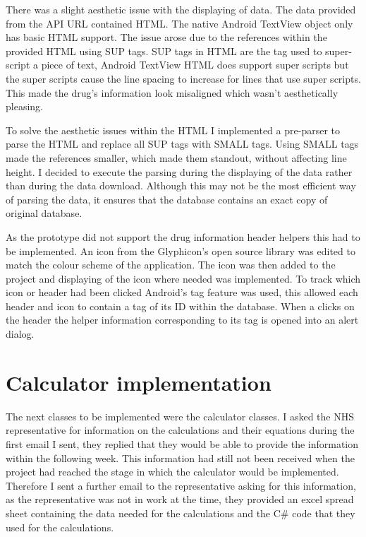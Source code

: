 There was a slight aesthetic issue with the displaying of data. The data provided from the API URL contained HTML. The native Android TextView object only has basic HTML support. The issue arose due to the references within the provided HTML using SUP tags. SUP tags in HTML are the tag used to super-script a piece of text, Android TextView HTML does support super scripts but the super scripts cause the line spacing to increase for lines that use super scripts. This made the drug’s information look misaligned which wasn’t aesthetically pleasing. 

To solve the aesthetic issues within the HTML I implemented a pre-parser to parse the HTML and replace all SUP tags with SMALL tags. Using SMALL tags made the references smaller, which made them standout, without affecting line height. I decided to execute the parsing during the displaying of the data rather than during the data download. Although this may not be the most efficient way of parsing the data, it ensures that the database contains an exact copy of original database.

As the prototype did not support the drug information header helpers this had to be implemented. An icon from the Glyphicon’s open source library \cite{glyph} was edited to match the colour scheme of the application. The icon was then added to the project and displaying of the icon where needed was implemented. To track which icon or header had been clicked Android’s tag feature was used, this allowed each header and icon to contain a tag of its ID within the database. When a clicks on the header the helper information corresponding to its tag is opened into an alert dialog.


\section{Calculator implementation}

The next classes to be implemented were the calculator classes.  I asked the NHS representative for information on the calculations and their equations during the first email I sent, they replied that they would be able to provide the information within the following week. This information had still not been received when the project had reached the stage in which the calculator would be implemented. Therefore I sent a further email to the representative asking for this information, as the representative was not in work at the time, they provided an excel spread sheet containing the data needed for the calculations and the C\# code that they used for the calculations. 

